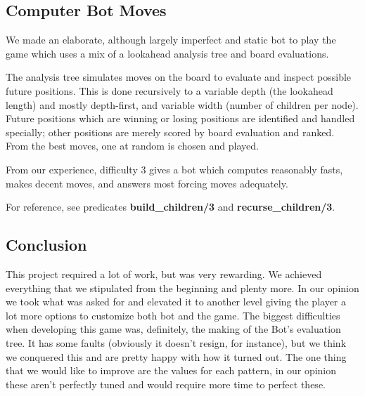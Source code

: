 \documentclass[12pt,a4paper,notitlepage]{article}
\begin{document}
\subsection{Computer Bot Moves}
\label{subsec:bot}

We made an elaborate, although largely imperfect and static bot to play the game which uses a mix of a lookahead analysis tree and board evaluations.

The analysis tree simulates moves on the board to evaluate and inspect possible future positions. This is done recursively to a variable depth (the lookahead length) and mostly depth-first, and variable width (number of children per node). Future positions which are winning or losing positions are identified and handled specially; other positions are merely scored by board evaluation and ranked. From the best moves, one at random is chosen and played.

From our experience, difficulty 3 gives a bot which computes reasonably fasts, makes decent moves, and answers most forcing moves adequately.

For reference, see predicates \textbf{build\_children/3} and \textbf{recurse\_children/3}.

\subsection{Conclusion}

This project required a lot of work, but was very rewarding.
We achieved everything that we stipulated from the beginning and plenty more. In our opinion we took what was asked for and elevated it to another level giving the player a lot more options to customize both bot and the game.
The biggest difficulties when developing this game was, definitely, the making of the Bot's evaluation tree. It has some faults (obviously it doesn't resign, for instance), but we think we conquered this and are pretty happy with how it turned out.
The one thing that we would like to improve are the values for each pattern, in our opinion these aren't perfectly tuned and would require more time to perfect these.

\printbibliography
\end{document}
